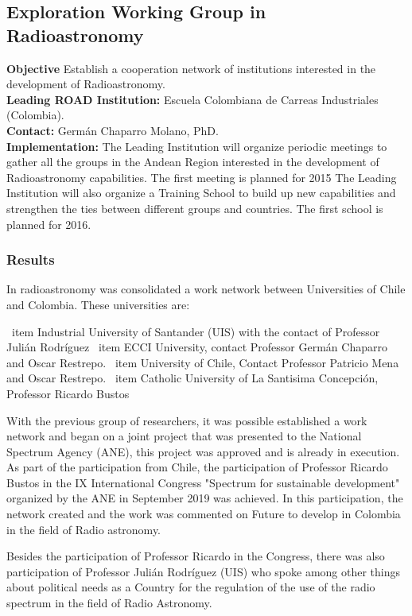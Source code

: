 

\subsection{Exploration Working Group in Radioastronomy}
\textbf{Objective} Establish a cooperation network of institutions interested in the development of Radioastronomy.
\\
\textbf{Leading ROAD Institution:} Escuela Colombiana de Carreas Industriales (Colombia).
\\
\textbf{Contact:} Germán Chaparro Molano, PhD. 
\\
\textbf{Implementation:} The Leading Institution will organize periodic meetings to gather all the groups in the Andean Region interested in the development of Radioastronomy capabilities. The first meeting is planned for 2015 The Leading Institution will also organize a Training School to build up new capabilities and strengthen the ties between different groups and countries. The first school is planned for 2016.

\subsubsection{Results}
In radioastronomy was consolidated a work network between Universities of Chile and Colombia.
These universities are:
\begin{enumerate}
    \ item Industrial University of Santander (UIS) with the contact of Professor Julián Rodríguez
    \ item ECCI University, contact Professor Germán Chaparro and Oscar Restrepo.
    \ item University of Chile, Contact Professor Patricio Mena and Oscar Restrepo.
    \ item Catholic University of La Santisima Concepción, Professor Ricardo Bustos
\end{enumerate}

With the previous group of researchers, it was possible established a work network and began on a joint project that was presented to the National Spectrum Agency (ANE), this project was approved and is already in execution. As part of the participation from Chile, the participation of Professor Ricardo Bustos in the IX International Congress "Spectrum for sustainable development" organized by the ANE in September 2019 was achieved. In this participation, the network created and the work was commented on Future to develop in Colombia in the field of Radio astronomy.

Besides the participation of Professor Ricardo in the Congress, there was also participation of Professor Julián Rodríguez (UIS) who spoke among other things about political needs as a Country for the regulation of the use of the radio spectrum in the field of Radio Astronomy.



